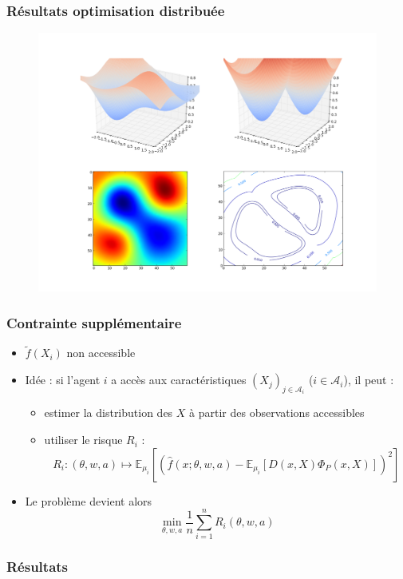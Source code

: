 \documentclass[c]{beamer}
\begin{document}
\begin{frame}
    \frametitle{Résultats optimisation distribuée}

    \begin{figure}
        \centering
        \includegraphics[width=.8\textwidth]{kernel_estimation_global}
    \end{figure}
\end{frame}

\begin{frame}
    \frametitle{Contrainte supplémentaire}

    \begin{itemize}
        \item $\tilde{f}(X_i)$ non accessible
        \item Idée : si l'agent $i$ a accès aux caractéristiques $(X_j)_{j \in \mathcal{A}_i}$
            ($i \in \mathcal{A}_i$), il peut :
            \begin{itemize}
                \item estimer la distribution des $X$ à partir des observations
                    accessibles
                \item utiliser le risque $R_i$ :
                    \[
                        R_i : (\theta, w, a) \mapsto \mathbb{E}_{\mu_i} \left[ \left( \hat{f}(x; \theta, w, a) - \mathbb{E}_{\mu_i}[D(x, X) \Phi_P(x, X)]\right)^2 \right]
                    \]
            \end{itemize}
        \item Le problème devient alors
            \[
                \min_{\theta, w, a} \frac{1}{n} \sum_{i = 1}^n R_i(\theta, w, a)
            \]
    \end{itemize}
\end{frame}

\begin{frame}
    \frametitle{Résultats}

\end{frame}
\end{document}
